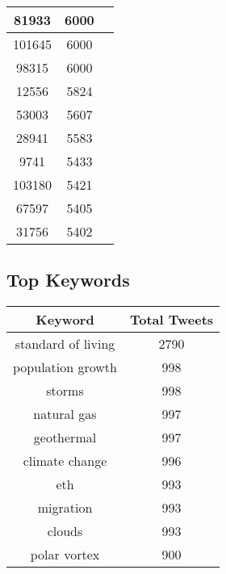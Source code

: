 \documentclass{article}\usepackage[T1]{fontenc}
\begin{document}
\begin{tabular}{|c|c|c|}
 \hline
81933 & 6000\\ 
 \hline
101645 & 6000\\ 
 \hline
98315 & 6000\\ 
 \hline
12556 & 5824\\ 
 \hline
53003 & 5607\\ 
 \hline
28941 & 5583\\ 
 \hline
9741 & 5433\\ 
 \hline
103180 & 5421\\ 
 \hline
67597 & 5405\\ 
 \hline
31756 & 5402\\ 
 \hline
\end{tabular}\subsection*{Top Keywords}\begin{tabular}{|c|c|}         \hline         Keyword & Total Tweets \\ 
 \hline
standard of living & 2790\\ 
 \hline
population growth & 998\\ 
 \hline
storms & 998\\ 
 \hline
natural gas & 997\\ 
 \hline
geothermal & 997\\ 
 \hline
climate change & 996\\ 
 \hline
eth & 993\\ 
 \hline
migration & 993\\ 
 \hline
clouds & 993\\ 
 \hline
polar vortex & 900\\ 
 \hline
\end{tabular}
\end{document}
